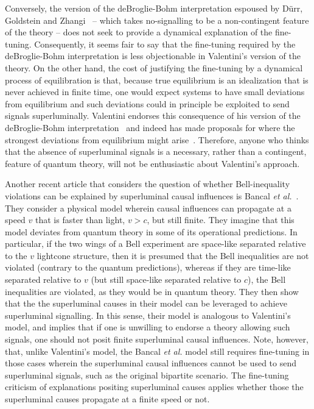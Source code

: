 \documentclass[12pt,onecolumn,nofootinbib]{revtex4-2}
\begin{document}
Conversely, the version of the deBroglie-Bohm interpretation espoused by D\"{u}rr, Goldstein and Zhangi~\cite{Durr1992}  -- which takes no-signalling to be a non-contingent feature of the theory -- does not seek to provide a dynamical explanation of the fine-tuning. Consequently, it seems fair to say that the fine-tuning required by the deBroglie-Bohm interpretation is less objectionable in Valentini's version of the theory. On the other hand, the cost of  justifying the fine-tuning by a dynamical process of equilibration is that, because true equilibrium is an idealization that is never achieved in finite time, one would expect systems to have small deviations from equilibrium and such deviations could in principle be exploited to send signals superluminally.  Valentini endorses this consequence of his version of the deBroglie-Bohm interpretation~\cite{Valentini2002} and indeed has made proposals for where the strongest deviations from equilibrium might arise~\cite{Valentini2004}.  Therefore, anyone who thinks that the absence of superluminal signals is a necessary, rather than a contingent, feature of quantum theory, will not be enthusiastic about Valentini's approach.

Another recent article that considers the question of whether Bell-inequality violations can be explained by superluminal causal influences is Bancal {\it et al.}~\cite{Bancal2012}.  They consider a physical model wherein causal influences can propagate at a speed $v$ that is faster than light, $v >c$, but still finite.  They imagine that this model deviates from quantum theory in some of its operational predictions.   In particular, if the two wings of a Bell experiment are space-like separated relative to the $v$ lightcone structure, then it is presumed that the Bell inequalities are not violated (contrary to the quantum predictions), whereas if they are time-like separated relative to $v$ (but still space-like separated relative to $c$), the Bell inequalities are violated, as they would be in quantum theory.  They then show that the the superluminal causes in their model can be leveraged to achieve superluminal signalling.  In this sense, their model is analogous to Valentini's model, and implies that if one is unwilling to endorse a theory allowing such signals, one should not posit finite superluminal causal influences.  Note, however, that, unlike Valentini's model, the Bancal {\it et al.} model still requires fine-tuning in those cases wherein the superluminal causal influences cannot be used to send superluminal signals, such as the original bipartite scenario.  The fine-tuning criticism of explanations positing superluminal causes applies whether those the superluminal causes propagate at a finite speed or not.
\end{document}
